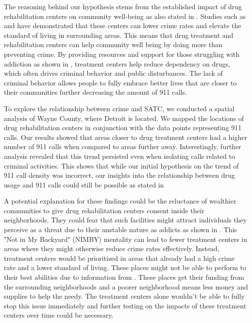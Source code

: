 \documentclass[12pt]{article}
\begin{document}
The reasoning behind our hypothesis stems from the established impact of drug rehabilitation centers on community well-being as also stated in \cite{SAT_centers_and_crime}.  Studies such as \cite{drugs_and_crime} and \cite{drugs_crime_space_time} have demonstrated that these centers can lower crime rates and elevate the standard of living in surrounding areas. This means that drug treatment and rehabilitation centers can help community well being by doing more than preventing crime. By providing resources and support for those struggling with addiction as shown in \cite{mental_healthcare_and_crime}, treatment centers help reduce dependency on drugs, which often drives criminal behavior and public disturbances. The lack of criminal behavior allows people to fully embrace better lives that are closer to their communities further decreasing the amount of 911 calls. 

To explore the relationship between crime and SATC, we conducted a spatial analysis of Wayne County, where Detroit is located. We mapped the locations of drug rehabilitation centers in conjunction with the data points representing 911 calls. Our results showed that areas closer to drug treatment centers had a higher number of 911 calls when compared to areas further away.  Interestingly, further analysis revealed that this trend persisted even when isolating calls related to criminal activities. This shows that while our initial hypothesis on the trend of 911 call density was incorrect, our insights into the relationship between drug usage and 911 calls could still be possible as stated in \cite{Socioeconomic-Determinants} 

A potential explanation for these findings could be the reluctance of wealthier communities to give drug rehabilitation centers consent inside their neighborhoods. They could fear that such facilities might attract individuals they perceive as a threat due to their unstable nature as addicts as shown in \cite{mental_health_and_disability}. This "Not in My Backyard" (NIMBY) mentality can lead to fewer treatment centers in areas where they might otherwise reduce crime rates effectively. Instead, treatment centers would be prioritized in areas that already had a high crime rate and a lower standard of living. These places might not be able to perform to their best abilities due to information from \cite{cost_of_drug_treatment}. These places get their funding from the surrounding neighborhoods and a poorer neighborhood means less money and supplies to help the needy. The treatment centers alone wouldn't be able to fully stop this issue immediately and further testing on the impacts of these treatment centers over time could be necessary. 
\end{document}
